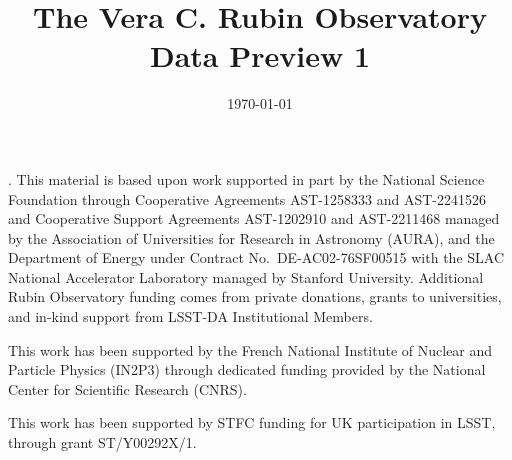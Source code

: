 \documentclass[ twocolumn,twocolappendix, linenumbers ,trackchanges]{aastex701}
\begin{document}
\setcounter{footnote}{0}
\date{\today}
\title{The Vera C. Rubin Observatory Data Preview 1}














\begin{acknowledgments}.
This material is based upon work supported in part by the National Science Foundation through Cooperative Agreements AST-1258333 and AST-2241526 and Cooperative Support Agreements AST-1202910 and AST-2211468 managed by the Association of Universities for Research in Astronomy (AURA), and the Department of Energy under Contract No.\ DE-AC02-76SF00515 with the SLAC National Accelerator Laboratory managed by Stanford University.
Additional Rubin Observatory funding comes from private donations, grants to universities, and in-kind support from LSST-DA Institutional Members.

This work has been supported by the French National Institute of Nuclear and Particle Physics (IN2P3) through dedicated funding provided by the National Center for Scientific Research (CNRS).

This work has been supported by STFC funding for UK participation in LSST, through grant ST/Y00292X/1.
\end{acknowledgments}
\vspace{5mm}



\clearpage
\appendix
\printglossaries



\end{document}

